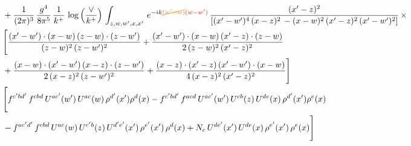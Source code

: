 \documentclass[9pt]{article}
\numberwithin{equation}{section}
\begin{document}
\begin{align}
&  + \frac{1}{(2\pi)^{3}}\, \frac{g^{4}}{8\pi^{5}}\,\frac{1}{k^{+}}\,\log{\left(\frac{\vee}{k^{+}}\right)}\,\int_{z,w,w^{\prime},x,x'}\, e^{-ik{\color{orange}\cancel{(w^{\prime}-w)}}{\color{red}(w-w^{\prime})}}\, \frac{(x'-z)^{2}}{\left[(x'-w')^{4}\,(x-z)^{2}\, - (x-w)^{2}\, (x'-z)^{2}\,(x'-w')^{2}\right]}\,  \times\notag \\ & \Bigg[\frac{(x'-w')\cdot (x-w)\, (z-w)\cdot (z-w')}{(z-w)^{2}\, (z-w')^{2}}+\frac{(x'-w')\cdot (x-w)\, (x'-z)\cdot (z-w)}{2\, (z-w)^{2}\, (x'-z)^{2}}\notag \\ & +\frac{(x-w)\cdot (x'-w')\, (x-z)\cdot (z-w')}{2\, (x-z)^{2}\, (z-w')^{2}}+\frac{(x-z)\cdot (x'-z)\, (x'-w')\cdot (x-w)}{4\, (x-z)^{2}\, (x'-z)^{2}}\Bigg] \notag \\ & \Bigg[f^{c'bd'}\,f^{cbd}\, U^{ac'}(w')\,U^{ac}(w)\,\rho^{d'}(x')\rho^{d}(x)- f^{c'bd'}\,f^{acd}\,U^{ac'}(w')\,U^{cb}(z)\,U^{de}(x)\,\rho^{d'}(x')\rho^{e}(x) \notag \\ & -f^{ac'd'}\,f^{cbd}\,U^{ac}(w)\,U^{c'b}(z)\,U^{d'e'}(x')\,\rho^{e'}(x')\,\rho^{d}(x) +N_{c}\,U^{de'}(x')\,U^{de}(x)\,\rho^{e'}(x')\,\rho^{e}(x)\Bigg]
\end{align}
\end{document}
